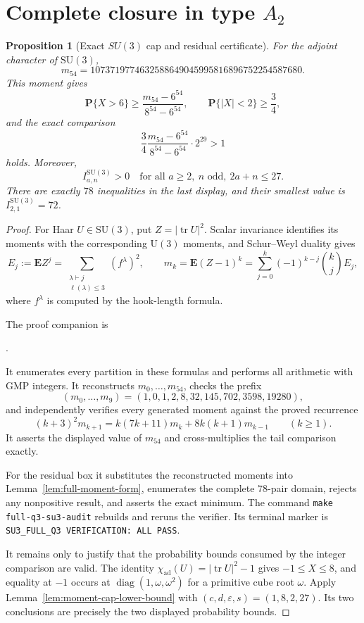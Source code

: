 \documentclass[11pt,reqno]{amsart}
\theoremstyle{plain}
\newtheorem{proposition}[theorem]{Proposition}
\theoremstyle{definition}
\newcommand{\chiad}{\chi_{\mathrm{ad}}}
\begin{document}
\section{Complete closure in type \texorpdfstring{$A_2$}{A2}}

\begin{proposition}[Exact $SU(3)$ cap and residual certificate]
\label{prop:su3-cap-residual-certificate}
For the adjoint character of $\mathrm{SU}(3)$,
\[
 m_{54}
 =1073719774632588649045995816896752254587680.
\]
This moment gives
\[
 \mathbf P\{X>6\}
 \geq\frac{m_{54}-6^{54}}{8^{54}-6^{54}},
 \qquad
 \mathbf P\{|X|<2\}\geq\frac34,
\]
and the exact comparison
\[
 \frac34\frac{m_{54}-6^{54}}{8^{54}-6^{54}}\cdot2^{29}>1
\]
holds.  Moreover,
\[
 I^{\mathrm{SU}(3)}_{a,n}>0
 \quad\text{for all }a\geq2,\ n\text{ odd},\ 2a+n\leq27.
\]
There are exactly $78$ inequalities in the last display, and their smallest
value is $I^{\mathrm{SU}(3)}_{2,1}=72$.
\end{proposition}

\begin{proof}
For Haar $U\in\mathrm{SU}(3)$, put $Z=|\operatorname{tr}U|^2$.  Scalar
invariance identifies its moments with the corresponding $\mathrm U(3)$
moments, and Schur--Weyl duality gives
\[
 E_j:=\mathbf E Z^j
 =\sum_{\substack{\lambda\vdash j\\\ell(\lambda)\leq3}}(f^\lambda)^2,
 \qquad
 m_k=\mathbf E(Z-1)^k
 =\sum_{j=0}^k(-1)^{k-j}\binom kjE_j,
\]
where $f^\lambda$ is computed by the hook-length formula.

The proof companion is
\begin{center}
.
\end{center}
It enumerates every partition in these formulas and performs all arithmetic with
GMP integers.  It reconstructs $m_0,\ldots,m_{54}$, checks the prefix
\[
 (m_0,\ldots,m_9)=(1,0,1,2,8,32,145,702,3598,19280),
\]
and independently verifies every generated moment against the proved
recurrence
\[
 (k+3)^2m_{k+1}=k(7k+11)m_k+8k(k+1)m_{k-1}\qquad(k\geq1).
\]
It asserts the displayed value of $m_{54}$ and cross-multiplies the tail
comparison exactly.

For the residual box it substitutes the reconstructed moments into
Lemma~\ref{lem:full-moment-form}, enumerates the complete $78$-pair domain,
rejects any nonpositive result, and asserts the exact minimum.  The command
\texttt{make full-q3-su3-audit} rebuilds and reruns the verifier.  Its
terminal marker is
\texttt{SU3\_FULL\_Q3 VERIFICATION: ALL PASS}.

It remains only to justify that the probability bounds consumed by the
integer comparison are valid.  The identity
$\chiad(U)=|\operatorname{tr}U|^2-1$ gives $-1\leq X\leq8$, and equality at
$-1$ occurs at $\operatorname{diag}(1,\omega,\omega^2)$ for a primitive cube
root $\omega$.  Apply Lemma~\ref{lem:moment-cap-lower-bound} with
$(c,d,\varepsilon,s)=(1,8,2,27)$.  Its two conclusions are precisely the
two displayed probability bounds.
\end{proof}
\end{document}
